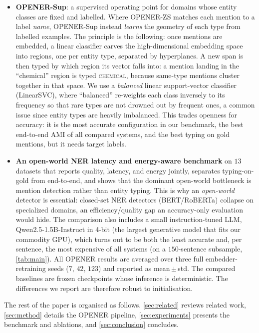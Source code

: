 \begin{itemize}
\item \textbf{OPENER-Sup}: a supervised operating point for domains whose entity classes are fixed and labelled. Where OPENER-ZS matches each mention to a label \emph{name}, OPENER-Sup instead \emph{learns} the geometry of each type from labelled examples. The principle is the following: once mentions are embedded, a linear classifier carves the high-dimensional embedding space into regions, one per entity type, separated by hyperplanes. A new span is then typed by which region its vector falls into: a mention landing in the ``chemical'' region is typed \textsc{chemical}, because same-type mentions cluster together in that space. We use a \emph{balanced} linear support-vector classifier (LinearSVC), where ``balanced'' re-weights each class inversely to its frequency so that rare types are not drowned out by frequent ones, a common issue since entity types are heavily imbalanced. This trades openness for accuracy: it is the most accurate configuration in our benchmark, the best end-to-end AMI of all compared systems, and the best typing on gold mentions, but it needs target labels.
\item \textbf{An open-world NER latency and energy-aware benchmark} on $13$ datasets that reports quality, latency, and energy jointly, separates typing-on-gold from end-to-end, and shows that the dominant open-world bottleneck is mention detection rather than entity typing. This is why an \emph{open-world} detector is essential: closed-set NER detectors (BERT/RoBERTa) collapse on specialized domains, an efficiency/quality gap an accuracy-only evaluation would hide. The comparison also includes a small instruction-tuned LLM, Qwen2.5-1.5B-Instruct in 4-bit (the largest generative model that fits our commodity GPU), which turns out to be both the least accurate and, per sentence, the most expensive of all systems (on a $150$-sentence subsample, \autoref{tab:main}). All OPENER results are averaged over three full embedder-retraining seeds ($7$, $42$, $123$) and reported as mean\,$\pm$\,std. The compared baselines are frozen checkpoints whose inference is deterministic. The differences we report are therefore robust to initialisation.
\end{itemize}

The rest of the paper is organised as follows.
\autoref{sec:related} reviews related work, \autoref{sec:method} details the OPENER pipeline, \autoref{sec:experiments} presents the benchmark and ablations, and \autoref{sec:conclusion} concludes.
